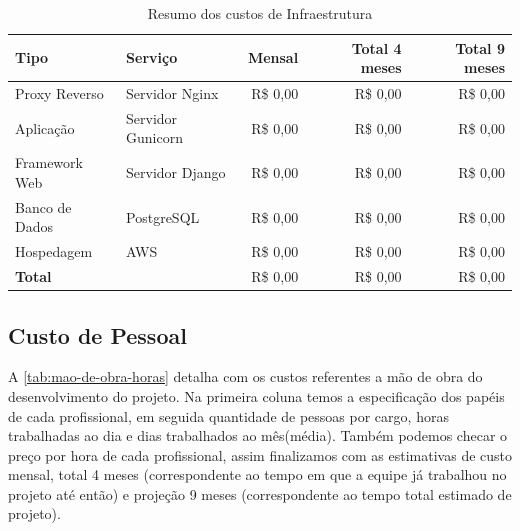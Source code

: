 \documentclass[
	12pt,				%
	openany,			%
	oneside,			%
	a4paper,			%
	english,			%
	french,				%
	spanish,			%
	brazil				%
	]{abntex2}
\begin{document}
\begin{table}[H]
	\centering
	\caption{Resumo dos custos de Infraestrutura}
	\label{tab:infraestrutura}
	\begin{tabular}{|l|l|r|r|r|}
		\hline
		\textbf{Tipo} & \textbf{Serviço} & \textbf{Mensal} & \textbf{Total 4 meses} & \textbf{Total 9 meses} \\
		\hline
		Proxy Reverso & Servidor Nginx & R\$ 0,00 & R\$ 0,00 & R\$ 0,00 \\
		\hline
		Aplicação & Servidor Gunicorn & R\$ 0,00 & R\$ 0,00 & R\$ 0,00 \\
		\hline
		Framework Web & Servidor Django & R\$ 0,00 & R\$ 0,00 & R\$ 0,00 \\
		\hline
		Banco de Dados & PostgreSQL & R\$ 0,00 & R\$ 0,00 & R\$ 0,00 \\
		\hline
		Hospedagem & AWS & R\$ 0,00 & R\$ 0,00 & R\$ 0,00 \\
		\hline
		\textbf{Total} & & R\$ 0,00 & R\$ 0,00 & R\$ 0,00 \\
		\hline
	\end{tabular}
\end{table}

\subsection{Custo de Pessoal}

A \autoref{tab:mao-de-obra-horas} detalha com os custos referentes a mão de obra do desenvolvimento do projeto. 
Na primeira coluna temos a especificação dos papéis de cada profissional, em seguida quantidade de pessoas por cargo, horas trabalhadas ao dia e dias trabalhados ao mês(média).
Também podemos checar o preço por hora de cada profissional, assim finalizamos com as estimativas de custo mensal, total 4 meses (correspondente ao tempo em que a equipe já trabalhou no projeto até então) e projeção 9 meses (correspondente ao tempo total estimado de projeto).
\end{document}
